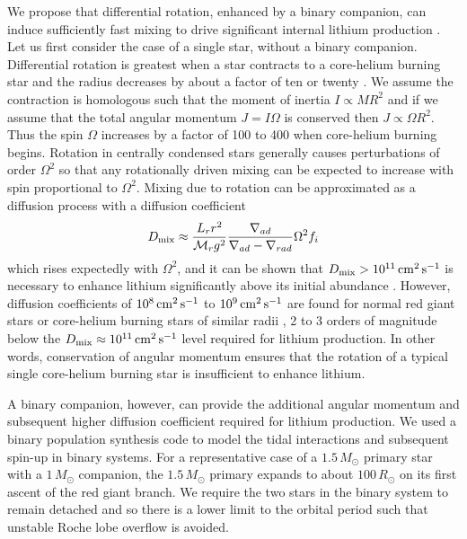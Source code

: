 \documentclass[twocolumn]{aastex62}
\begin{document}
We propose that differential rotation, enhanced by a binary companion, can induce sufficiently fast mixing to drive significant internal lithium production \citep{Costa_2002}. 
Let us first consider the case of a single star, without a binary companion.
Differential rotation is greatest when a star contracts to a core-helium burning star and the radius decreases by about a factor of ten or twenty \citep{Despain_1981}. We assume the contraction is homologous such that the moment of inertia  $I \propto MR^2$ and if we assume that the total angular momentum $J = I\Omega$ is conserved then $J \propto \Omega{}R^2$. Thus the spin $\Omega$ increases by a factor of 100 to 400 when core-helium burning begins. Rotation in centrally condensed stars \citep{Eddington_1929} generally causes perturbations of order $\Omega^2$ so that any rotationally driven mixing can be expected to increase with spin proportional to $\Omega^2$. 
Mixing due to rotation can be approximated as a diffusion process with a diffusion coefficient
\begin{equation}
D_{\rm mix} \approx \frac{L_{r}r^2}{\mathcal{M}_{r}g^{2}}\frac{\nabla_{ad}}{\nabla_{ad} - \nabla_{rad}}\Omega^2{f_i}
\end{equation}
\noindent{}which rises expectedly with $\Omega^2$, and it can be shown that $D_{\rm mix} > 10^{11}\,{\rm cm}^2\,{\rm s}^{-1}$ is necessary to enhance lithium significantly above its initial abundance \citep{Denissenkov_2004}. However, diffusion coefficients of $10^8\,{\rm cm}^2\,{\rm s}^{-1}$ to $10^9\,{\rm cm}^2\,{\rm s}^{-1}$ are found for normal red giant stars or core-helium burning stars of similar radii \citep{Denissenkov_2004,Palacios_2006}, 2 to 3 orders of magnitude below the ${D_{\rm mix} \approx 10^{11}\,{\rm cm}^2\,{\rm s}^{-1}}$ level required for lithium production. 
In other words, conservation of angular momentum ensures that the rotation of a typical single core-helium burning star is insufficient to enhance lithium. 


A binary companion, however, can provide the additional angular momentum and subsequent higher
diffusion coefficient required for lithium production. We used a binary population 
synthesis code \citep{Hurley_2002} to model the tidal interactions and subsequent spin-up in binary systems.
For a representative case of a $1.5\,M_\odot$ primary star with a $1\,M_\odot$ companion,
the $1.5\,M_\odot$ primary expands to about $100\,R_\odot$ on its first 
ascent of the red giant branch. We require the two stars in the binary system 
to remain detached and so there
is a lower limit to the orbital period such that unstable Roche lobe overflow is avoided.
\end{document}
